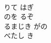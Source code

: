 \documentclass[10pt,b5j]{tarticle} %
\begin{document}
\begin{enumerate}
\begin{minipage}[c]{\blocksize}
        \vspace{\linespace}
        \item~\\
        りて はぎ\\
        のを るぞ\\
        るまじき がの\\
        べたし き

    
    \end{minipage}
\end{enumerate} %
\end{document}
